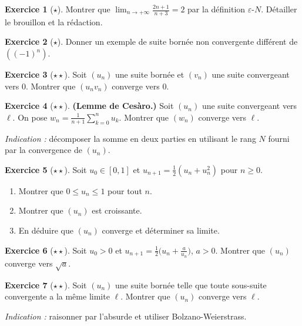 \documentclass[12pt,a4paper,openany]{book}
\theoremstyle{definition}
\newtheorem{exercice}{Exercice}[chapter]
\newcommand{\eps}{\varepsilon}
\begin{document}
\begin{exercice}[$\star$]\label{exo:cv-2n+1-sur-n}
  Montrer que $\lim_{n \to +\infty} \frac{2n+1}{n+3} = 2$ par la définition $\eps$-$N$.
  Détailler le brouillon et la rédaction.
\end{exercice}

\begin{exercice}[$\star$]\label{exo:suite-bornee-non-cv}
  Donner un exemple de suite bornée non convergente différent de $((-1)^n)$.
\end{exercice}

\begin{exercice}[$\star\star$]\label{exo:produit-bornee-cv0}
  Soit $(u_n)$ une suite bornée et $(v_n)$ une suite convergeant vers $0$.
  Montrer que $(u_n v_n)$ converge vers $0$.
\end{exercice}

\begin{exercice}[$\star\star$]\label{exo:cesaro}
  \textbf{(Lemme de Cesàro.)} Soit $(u_n)$ une suite convergeant vers $\ell$.
  On pose $w_n = \frac{1}{n+1}\sum_{k=0}^{n} u_k$. Montrer que $(w_n)$ converge vers $\ell$.

  \textit{Indication :} décomposer la somme en deux parties en utilisant le rang $N$
  fourni par la convergence de $(u_n)$.
\end{exercice}

\begin{exercice}[$\star\star$]\label{exo:suite-recurrente-cos}
  Soit $u_0 \in [0, 1]$ et $u_{n+1} = \frac{1}{2}(u_n + u_n^2)$ pour $n \geq 0$.
  \begin{enumerate}[label=(\alph*)]
    \item Montrer que $0 \leq u_n \leq 1$ pour tout $n$.
    \item Montrer que $(u_n)$ est croissante.
    \item En déduire que $(u_n)$ converge et déterminer sa limite.
  \end{enumerate}
\end{exercice}

\begin{exercice}[$\star\star$]\label{exo:sqrt-recurrence}
  Soit $u_0 > 0$ et $u_{n+1} = \frac{1}{2}\bigl(u_n + \frac{a}{u_n}\bigr)$, $a > 0$.
  Montrer que $(u_n)$ converge vers $\sqrt{a}$.
\end{exercice}

\begin{exercice}[$\star\star$]\label{exo:bolzano-application}
  Soit $(u_n)$ une suite bornée telle que toute sous-suite convergente a la même limite $\ell$.
  Montrer que $(u_n)$ converge vers $\ell$.

  \textit{Indication :} raisonner par l'absurde et utiliser Bolzano-Weierstrass.
\end{exercice}
\end{document}
